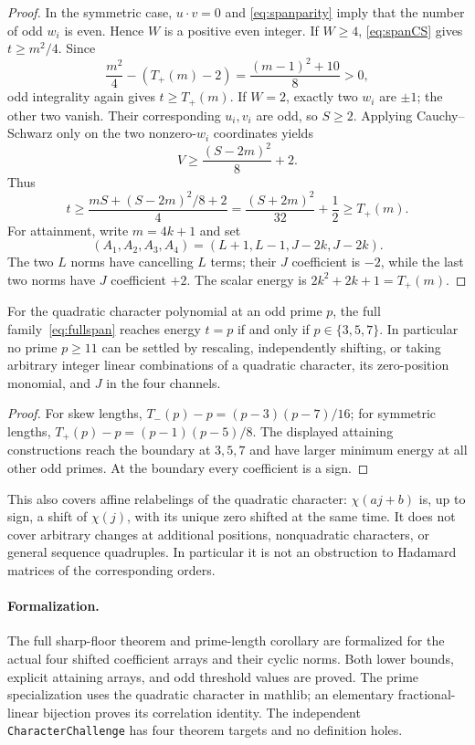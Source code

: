 \begin{proof}
In the symmetric case, $u\cdot v=0$ and
\eqref{eq:spanparity} imply that the number of odd $w_i$ is even.
Hence $W$ is a positive even integer. If $W\ge4$,
\eqref{eq:spanCS} gives $t\ge m^2/4$. Since
\[
 \frac{m^2}{4}-(T_+(m)-2)
 =\frac{(m-1)^2+10}{8}>0,
\]
odd integrality again gives $t\ge T_+(m)$. If $W=2$, exactly two
$w_i$ are $\pm1$; the other two vanish. Their corresponding $u_i,v_i$
are odd, so $S\ge2$. Applying Cauchy--Schwarz only on the two
nonzero-$w_i$ coordinates yields
\[
 V\ge\frac{(S-2m)^2}{8}+2.
\]
Thus
\[
 t\ge\frac{mS+(S-2m)^2/8+2}{4}
 =\frac{(S+2m)^2}{32}+\frac12\ge T_+(m).
\]
For attainment, write $m=4k+1$ and set
\[
 (A_1,A_2,A_3,A_4)=(L+1,L-1,J-2k,J-2k).
\]
The two $L$ norms have cancelling $L$ terms; their $J$ coefficient
is $-2$, while the last two norms have $J$ coefficient $+2$.
The scalar energy is $2k^2+2k+1=T_+(m)$.
\end{proof}

\begin{corollary}
For the quadratic character polynomial at an odd prime $p$, the full
family~\eqref{eq:fullspan} reaches energy $t=p$ if and only if
$p\in\{3,5,7\}$. In particular no prime $p\ge11$ can be settled
by rescaling, independently shifting, or taking arbitrary integer
linear combinations of a quadratic character, its zero-position
monomial, and $J$ in the four channels.
\end{corollary}
\begin{proof}
For skew lengths,
$T_-(p)-p=(p-3)(p-7)/16$; for symmetric lengths,
$T_+(p)-p=(p-1)(p-5)/8$. The displayed attaining constructions
reach the boundary at $3,5,7$ and have larger minimum energy at all
other odd primes. At the boundary every coefficient is a sign.
\end{proof}

This also covers affine relabelings of the quadratic character:
$\chi(aj+b)$ is, up to sign, a shift of $\chi(j)$, with its unique
zero shifted at the same time. It does not cover arbitrary changes
at additional positions, nonquadratic characters, or general sequence
quadruples. In particular it is not an obstruction to Hadamard matrices
of the corresponding orders.

\paragraph{Formalization.}
The full sharp-floor theorem and prime-length corollary are formalized
for the actual four shifted coefficient arrays and their cyclic norms.
Both lower bounds, explicit attaining arrays, and odd threshold values
are proved. The prime specialization uses the quadratic character in
mathlib; an elementary fractional-linear bijection proves its correlation
identity. The independent \texttt{CharacterChallenge} has four theorem
targets and no definition holes.

